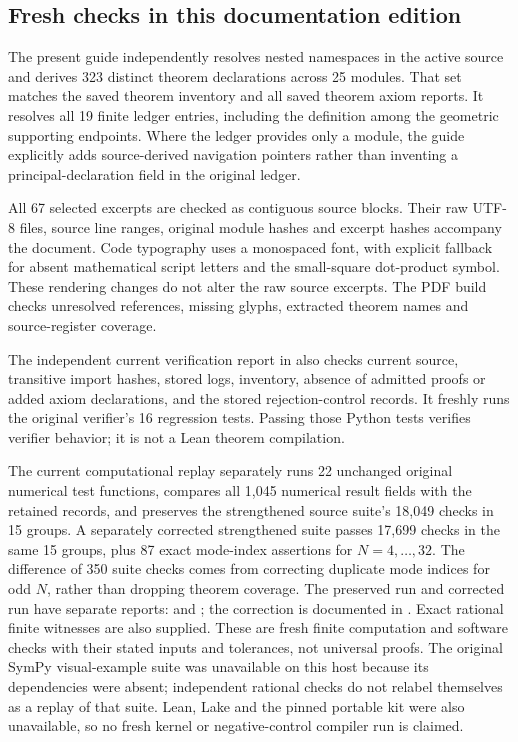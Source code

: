 \subsection{Fresh checks in this documentation edition}
The present guide independently resolves nested namespaces in the active source and derives 323 distinct theorem declarations across 25 modules. That set matches the saved theorem inventory and all saved theorem axiom reports. It resolves all 19 finite ledger entries, including the definition  among the geometric supporting endpoints. Where the ledger provides only a module, the guide explicitly adds source-derived navigation pointers rather than inventing a principal-declaration field in the original ledger.

All 67 selected excerpts are checked as contiguous source blocks. Their raw UTF-8 files, source line ranges, original module hashes and excerpt hashes accompany the document. Code typography uses a monospaced font, with explicit fallback for absent mathematical script letters and the small-square dot-product symbol. These rendering changes do not alter the raw source excerpts. The PDF build checks unresolved references, missing glyphs, extracted theorem names and source-register coverage.

The independent current verification report in  also checks current source, transitive import hashes, stored logs, inventory, absence of admitted proofs or added axiom declarations, and the stored rejection-control records. It freshly runs the original verifier's 16 regression tests. Passing those Python tests verifies verifier behavior; it is not a Lean theorem compilation.

The current computational replay separately runs 22 unchanged original numerical test functions, compares all 1,045 numerical result fields with the retained records, and preserves the strengthened source suite's 18,049 checks in 15 groups. A separately corrected strengthened suite passes 17,699 checks in the same 15 groups, plus 87 exact mode-index assertions for $N=4,\ldots,32$. The difference of 350 suite checks comes from correcting duplicate mode indices for odd $N$, rather than dropping theorem coverage. The preserved run and corrected run have separate reports:  and ; the correction is documented in . Exact rational finite witnesses are also supplied. These are fresh finite computation and software checks with their stated inputs and tolerances, not universal proofs. The original SymPy visual-example suite was unavailable on this host because its dependencies were absent; independent rational checks do not relabel themselves as a replay of that suite. Lean, Lake and the pinned portable kit were also unavailable, so no fresh kernel or negative-control compiler run is claimed.

